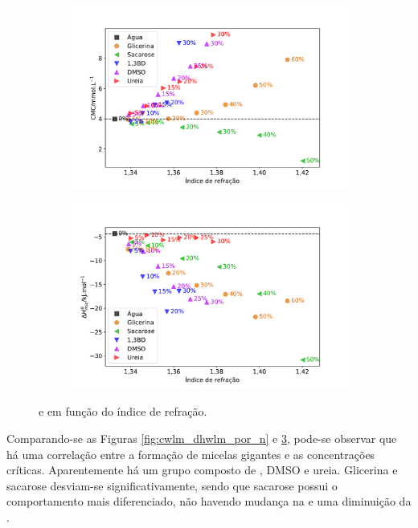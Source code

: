 		\begin{figure}[h]
			\begin{subfigure}[t]{0.5\textwidth}
				\centering
				\includegraphics[width=\textwidth]{imagens/itc/CMC_por_n}
				\caption{\cmc}
				\label{fig:cmc_por_n}
			\end{subfigure} %
			\begin{subfigure}[t]{0.5\textwidth}
				\centering
				\includegraphics[width=\textwidth]{imagens/itc/DH_por_n}
				\caption{\DHmic}
				\label{fig:dh_por_n}
			\end{subfigure}
			
			\caption{\cmc{} e \DHmic{} em função do índice de refração.}
			\label{fig:cmc_dh_por_n}
		\end{figure}

		Comparando-se as Figuras \ref{fig:cwlm_dhwlm_por_n} e \ref{fig:cmc_dh_por_n}, pode-se observar que há uma correlação entre a formação de micelas gigantes e as concentrações críticas. Aparentemente há um grupo composto de \BD, DMSO e ureia. Glicerina e sacarose desviam-se significativamente, sendo que sacarose possui o comportamento mais diferenciado, não havendo mudança na \cwlm{} e uma diminuição da \cmc{}.
		

